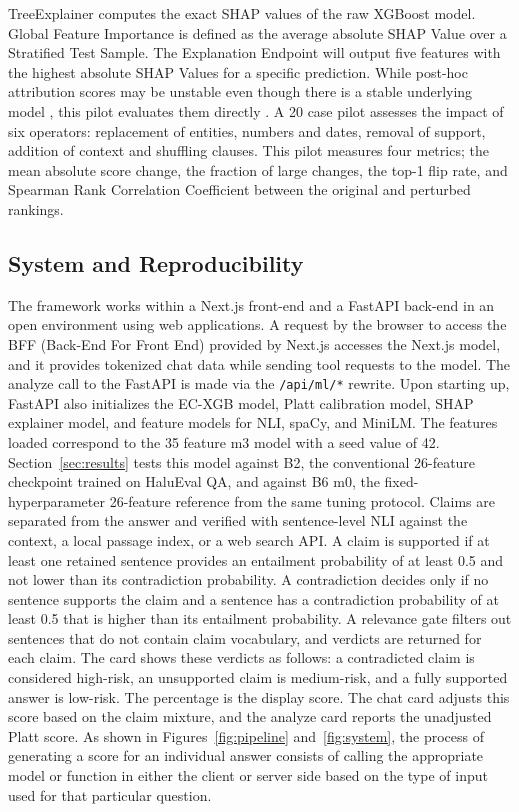 \documentclass[a4paper,fleqn]{cas-sc}
\begin{document}
TreeExplainer computes the exact SHAP values \cite{shap} of the raw XGBoost model. Global Feature Importance is defined as the average absolute SHAP Value over a Stratified Test Sample. The Explanation Endpoint will output five features with the highest absolute SHAP Values for a specific prediction. While post-hoc attribution scores may be unstable even though there is a stable underlying model \cite{kelodjou2024shap}, this pilot evaluates them directly \cite{adebayo2018}. A 20 case pilot assesses the impact of six operators: replacement of entities, numbers and dates, removal of support, addition of context and shuffling clauses. This pilot measures four metrics; the mean absolute score change, the fraction of large changes, the top-1 flip rate, and Spearman Rank Correlation Coefficient between the original and perturbed rankings.

\subsection{System and Reproducibility}

The framework works within a Next.js front-end and a FastAPI back-end in an open environment using web applications. A request by the browser to access the BFF (Back-End For Front End) provided by Next.js accesses the Next.js model, and it provides tokenized chat data while sending tool requests to the model. The analyze call to the FastAPI is made via the \texttt{/api/ml/*} rewrite. Upon starting up, FastAPI also initializes the EC-XGB model, Platt calibration model, SHAP explainer model, and feature models for NLI, spaCy, and MiniLM. The features loaded correspond to the 35 feature m3 model with a seed value of 42. Section~\ref{sec:results} tests this model against B2, the conventional 26-feature checkpoint trained on HaluEval QA, and against B6 m0, the fixed-hyperparameter 26-feature reference from the same tuning protocol. Claims are separated from the answer and verified with sentence-level NLI against the context, a local passage index, or a web search API. A claim is supported if at least one retained sentence provides an entailment probability of at least 0.5 and not lower than its contradiction probability. A contradiction decides only if no sentence supports the claim and a sentence has a contradiction probability of at least 0.5 that is higher than its entailment probability. A relevance gate filters out sentences that do not contain claim vocabulary, and verdicts are returned for each claim. The card shows these verdicts as follows: a contradicted claim is considered high-risk, an unsupported claim is medium-risk, and a fully supported answer is low-risk. The percentage is the display score. The chat card adjusts this score based on the claim mixture, and the analyze card reports the unadjusted Platt score. As shown in Figures~\ref{fig:pipeline} and~\ref{fig:system}, the process of generating a score for an individual answer consists of calling the appropriate model or function in either the client or server side based on the type of input used for that particular question.
\end{document}
